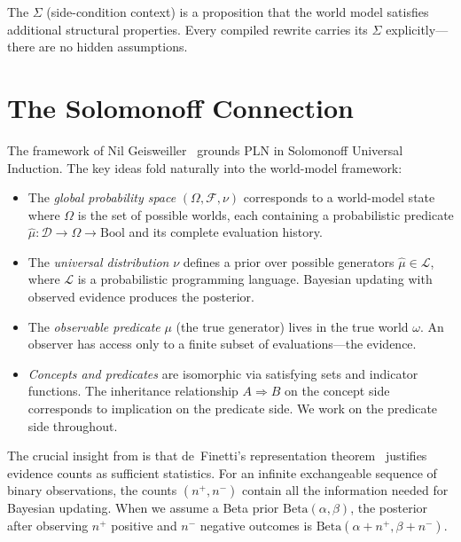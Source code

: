 \documentclass[11pt,openany]{report}
\begin{document}
The $\Sigma$ (side-condition context) is a proposition that the world model
satisfies additional structural properties.  Every compiled rewrite carries
its $\Sigma$ explicitly---there are no hidden assumptions.

\section{The Solomonoff Connection}

The \nuPLN{} framework of Nil Geisweiller~\cite{nuPLN2026} grounds PLN in
Solomonoff Universal Induction.  The key ideas fold naturally into the
world-model framework:

\begin{itemize}
\item The \emph{global probability space} $(\Omega, \mathcal{F}, \nu)$
  corresponds to a world-model state where $\Omega$ is the set of possible
  worlds, each containing a probabilistic predicate
  $\hat{\mu} : \mathcal{D} \to \Omega \to \mathrm{Bool}$ and its complete
  evaluation history.

\item The \emph{universal distribution} $\nu$ defines a prior over possible
  generators $\hat{\mu} \in \mathcal{L}$, where $\mathcal{L}$ is a
  probabilistic programming language.  Bayesian updating with observed
  evidence produces the posterior.

\item The \emph{observable predicate} $\mu$ (the true generator) lives in
  the true world $\omega$.  An observer has access only to a finite subset
  of evaluations---the evidence.

\item \emph{Concepts and predicates} are isomorphic via satisfying sets
  and indicator functions.  The inheritance relationship
  $A \Rightarrow B$ on the concept side corresponds to implication on the
  predicate side.  We work on the predicate side throughout.
\end{itemize}

The crucial insight from \nuPLN{} is that de~Finetti's representation
theorem~\cite{definetti1937} justifies evidence counts as sufficient
statistics.  For an infinite exchangeable sequence of binary observations,
the counts $(n^+, n^-)$ contain all the information needed for Bayesian
updating.  When we assume a Beta prior $\text{Beta}(\alpha, \beta)$, the
posterior after observing $n^+$ positive and $n^-$ negative outcomes is
$\text{Beta}(\alpha + n^+, \beta + n^-)$.
\end{document}
